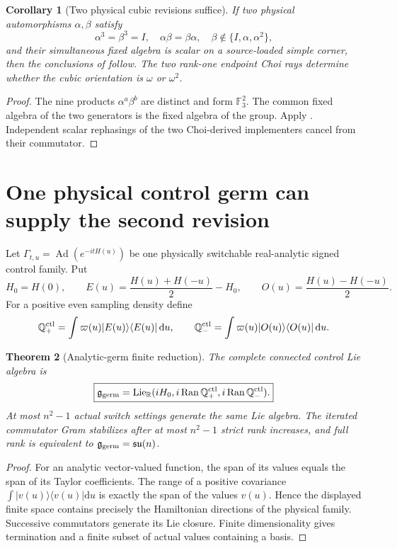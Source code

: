 \documentclass[11pt,oneside,openany]{book}
\numberwithin{equation}{chapter}
\newtheorem{theorem}{Theorem}[chapter]
\newtheorem{corollary}[theorem]{Corollary}
\theoremstyle{definition}
\theoremstyle{remark}
\newcommand{\R}{\mathbb R}
\newcommand{\Ran}{\operatorname{Ran}}
\newcommand{\Ad}{\operatorname{Ad}}
\newcommand{\dd}{\mathrm d}
\newcommand{\Fthree}{\mathbb F_3}
\begin{document}
\begin{corollary}[Two physical cubic revisions suffice]
\label{cor:v6-two-word-qutrit}
If two physical automorphisms \(\alpha,\beta\) satisfy
\[
 \alpha^3=\beta^3=I,
 \quad \alpha\beta=\beta\alpha,
 \quad \beta\notin\{I,\alpha,\alpha^2\},
\]
and their simultaneous fixed algebra is scalar on a source-loaded simple
corner, then the conclusions of  follow.  The two
rank-one endpoint Choi rays determine whether the cubic orientation is
\(\omega\) or \(\omega^2\).
\end{corollary}

\begin{proof}
The nine products \(\alpha^a\beta^b\) are distinct and form
\(\Fthree^2\).  The common fixed algebra of the two generators is the fixed
algebra of the group.  Apply .  Independent scalar
rephasings of the two Choi-derived implementers cancel from their commutator.
\end{proof}

\section{One physical control germ can supply the second revision}
Let \(\Gamma_{t,u}=\Ad(e^{-itH(u)})\) be one physically switchable real-analytic
signed control family.  Put
\[
 H_0=H(0),\qquad
 E(u)=\frac{H(u)+H(-u)}{2}-H_0,\qquad
 O(u)=\frac{H(u)-H(-u)}{2}.
\]
For a positive even sampling density define
\[
 \mathbb Q_+^{\rm ctl}=\int\varpi(u)|E(u)\rangle\langle E(u)|\, \dd u,
 \qquad
 \mathbb Q_-^{\rm ctl}=\int\varpi(u)|O(u)\rangle\langle O(u)|\, \dd u.
\]

\begin{theorem}[Analytic-germ finite reduction]
\label{thm:v6-control-germ}
The complete connected control Lie algebra is
\[
 \boxed{\mathfrak g_{\rm germ}
 =\operatorname{Lie}_{\R}
 (iH_0,i\Ran\mathbb Q_+^{\rm ctl},i\Ran\mathbb Q_-^{\rm ctl}).}
\]
At most \(n^2-1\) actual switch settings generate the same Lie algebra.  The
iterated commutator Gram stabilizes after at most \(n^2-1\) strict rank
increases, and full rank is equivalent to
\(\mathfrak g_{\rm germ}=\mathfrak{su}(n)\).
\end{theorem}

\begin{proof}
For an analytic vector-valued function, the span of its values equals the span
of its Taylor coefficients.  The range of a positive covariance
\(\int|v(u)\rangle\langle v(u)|\dd u\) is exactly the span of the values
\(v(u)\).  Hence the displayed finite space contains precisely the Hamiltonian
directions of the physical family.  Successive commutators generate its Lie
closure.  Finite dimensionality gives termination and a finite subset of
actual values containing a basis.
\end{proof}
\end{document}
